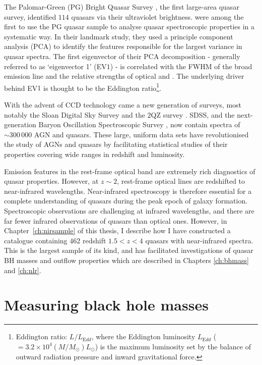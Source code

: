 The Palomar-Green (PG) Bright Quasar Survey \citep[BQS;][]{schmidt83}, the first large-area quasar survey, identified $114$ quasars via their ultraviolet brightness. 
\citet{boroson92} were among the first to use the PG quasar sample to analyse quasar spectroscopic properties in a systematic way. 
In their landmark study, they used a principle component analysis (PCA) to identify the features responsible for the largest variance in quasar spectra. 
The first eigenvector of their PCA decomposition - generally referred to as `eigenvector 1' (EV$1$) - is correlated with the FWHM of the broad \hb emission line and the relative strengths of optical  and \hbns. 
The underlying driver behind EV$1$ is thought to be the Eddington ratio\footnote{Eddington ratio: $L/L_{\mathrm Edd}$, where the Eddington luminosity $L_{\mathrm Edd}$ ($=3.2\times10^4(M/M_\odot)L_\odot$) is the maximum luminosity set by the balance of outward radiation pressure and inward gravitational force.}. 

With the advent of CCD technology came a new generation of surveys, most notably the Sloan Digital Sky Survey \citep[SDSS;][]{york00} and the $2$QZ survey \citep{croom04}. 
SDSS, and the next-generation Baryon Oscillation Spectroscopic Survey \citep[BOSS;][]{dawson13}, now contain spectra of $\sim300\,000$ AGN and quasars. 
These large, uniform data sets have revolutionised the study of AGNs and quasars by facilitating statistical studies of their properties covering wide ranges in redshift and luminosity.

Emission features in the rest-frame optical band are extremely rich diagnostics of quasar properties. 
However, at $z\sim2$, rest-frame optical lines are redshifted to near-infrared wavelengths. 
Near-infrared spectroscopy is therefore essential for a complete understanding of quasars during the peak epoch of galaxy formation. 
Spectroscopic observations are challenging at infrared wavelengths, and there are far fewer infrared observations of quasars than optical ones. 
However, in Chapter~\ref{ch:nirsample} of this thesis, I describe how I have constructed a catalogue containing $462$ redshift $1.5 < z < 4$ quasars with near-infrared spectra. 
This is the largest sample of its kind, and has facilitated investigations of quasar BH masses and outflow properties which are described in Chapters \ref{ch:bhmass} and \ref{ch:nlr}.   

\section{Measuring black hole masses}


